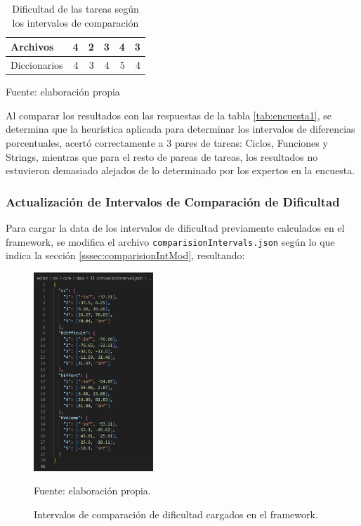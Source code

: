 \documentclass[letterpaper,12pt]{article}
\begin{document}
\begin{table}[H]
\begin{tabular}{|l|r|r|r|r|r|}
    Archivos        & 4                                                                                                & 2                                           & 3                                      & 4                                     & 3                                      \\ \hline
    Diccionarios    & 4                                                                                                & 3                                           & 4                                      & 5                                     & 4                                      \\ \hline
  \end{tabular}
  \caption{Dificultad de las tareas según los intervalos de comparación} Fuente: elaboración propia
  \label{tab:difDifferences}
\end{table}
Al comparar los resultados con las respuestas de la tabla \ref{tab:encuesta1}, se determina que la heurística aplicada para determinar los intervalos de diferencias porcentuales, acertó correctamente a 3 pares de tareas: Ciclos, Funciones y Strings, mientras que para el resto de pareas de tareas, los resultados no estuvieron demasiado alejados de lo determinado por los expertos en la encuesta.

\subsubsection{Actualización de Intervalos de Comparación de Dificultad}

Para cargar la data de los intervalos de dificultad previamente calculados en el framework, se modifica el archivo \texttt{comparisionIntervals.json} según lo que indica la sección \ref{sssec:comparisionIntMod}, resultando:

\begin{figure}[H]
  \centering
  \includegraphics[width=0.4\textwidth]{figures/intervals5.png}
  \caption{Intervalos de comparación de dificultad cargados en el framework.} Fuente: elaboración propia.
  \label{img:intervals5}
\end{figure}
\end{document}
